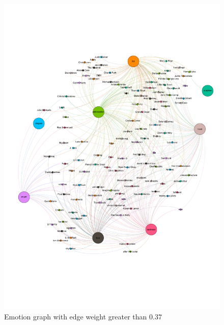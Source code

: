 \documentclass[10pt,a4paper]{article}
\begin{document}
		\begin{figure}[htb]
			\centering
			\includegraphics[trim=0mm 50mm 0mm 50mm, clip, width=\linewidth]{data/emotion_graph}
			\caption{Emotion graph with edge weight greater than $0.37$}
			\label{fig:emotiongraph}
		\end{figure}
		
\end{document}
